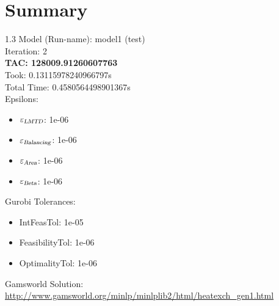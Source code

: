 \documentclass{article}%
\begin{document}
%
\normalsize%
\section{Summary}%
\thispagestyle{plain}%
\begin{spacing}{1.3}%
\Large%
Model (Run-name): model1 (test)\\%
Iteration: 2\\%
\textbf{TAC: 128009.91260607763}\\%
Took: 0.13115978240966797s\\%
Total Time: 0.4580564498901367s\\%
Epsilons:%
\begin{itemize}%
	\item $\varepsilon_{\textsl{LMTD}}$: 1e-06%
	\item $\varepsilon_{\textsl{Balancing}}$: 1e-06%
	\item $\varepsilon_{\textsl{Area}}$: 1e-06%
	\item $\varepsilon_{\textsl{Beta}}$: 1e-06%
\end{itemize}%
Gurobi Tolerances:%
\begin{itemize}%
	\item IntFeasTol: 1e-05%
	\item FeasibilityTol: 1e-06%
	\item OptimalityTol: 1e-06%
\end{itemize}%
\end{spacing}%
\normalsize%
Gamsworld Solution: \url{http://www.gamsworld.org/minlp/minlplib2/html/heatexch_gen1.html}%
%
\clearpage%
\end{document}
